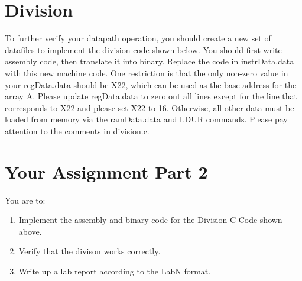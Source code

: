 \section{Division}
To further verify your datapath operation, you should create a new set of datafiles to implement the division code shown below.  You should first write assembly code, then translate it into binary.  Replace the code in instrData.data with this new machine code.  One restriction is that the only non-zero value in your regData.data should be X22, which can be used as the base address for the array A.  Please update regData.data to zero out all lines except for the line that corresponds to X22 and please set X22 to 16.  Otherwise, all other data must be loaded from memory via the ramData.data and LDUR commands.  Please pay attention to the comments in division.c.



\section{Your Assignment Part 2}

You are to:
\begin{enumerate}
	\item Implement the assembly and binary code for the Division C Code shown above.
	\item Verify that the divison works correctly.
	\item Write up a lab report according to the LabN format.
\end{enumerate} 
